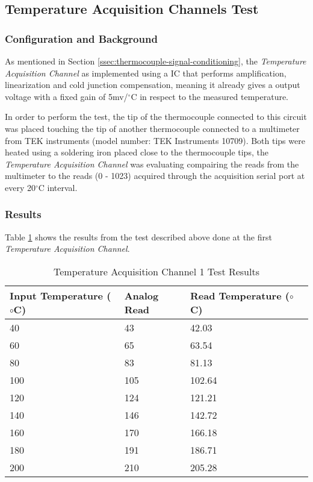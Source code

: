 \subsection{Temperature Acquisition Channels Test}\label{sec:temperature-acquisition-channels-test}
	
	\subsubsection{Configuration and Background}

		As mentioned in Section \ref{ssec:thermocouple-signal-conditioning}, the \textit{Temperature Acquisition Channel} as implemented using a IC that performs amplification, linearization and cold junction compensation, meaning it already gives a output voltage with a fixed gain of 5mv/$^{\circ}$C in respect to the measured temperature.
		\par
		In order to perform the test, the tip of the thermocouple connected to this circuit was placed touching the tip of another thermocouple connected to a multimeter from TEK instruments (model number: TEK Instruments 10709). Both tips were heated using a soldering iron placed close to the thermocouple tips, the \textit{Temperature Acquisition Channel} was evaluating compairing the reads from the multimeter to the reads (0 - 1023) acquired through the acquisition serial port at every 20$^{\circ}$C interval.

	\subsubsection{Results}


			Table \ref{table:results-temp1-test} shows the results from the test described above done at the first \textit{Temperature Acquisition Channel}.

				\begin{table}[h!]
					\begin{tabular}{|l|l|l|l|}
						\hline
						\textbf{Input Temperature (${\circ}$C)} & \textbf{Analog Read} & \textbf{Read Temperature (${\circ}$C)} \\ \hline
						40 & 43 & 42.03 \\ \hline
						60 & 65 & 63.54 \\ \hline
						80 & 83 & 81.13 \\ \hline
						100 & 105 & 102.64 \\ \hline
						120 & 124 & 121.21 \\ \hline
						140 & 146 & 142.72 \\ \hline
						160 & 170 & 166.18 \\ \hline
						180 & 191 & 186.71 \\ \hline
						200 & 210 & 205.28 \\ \hline
					\end{tabular}
					\caption{Temperature Acquisition Channel 1 Test Results}
					\label{table:results-temp1-test}
				\end{table}

